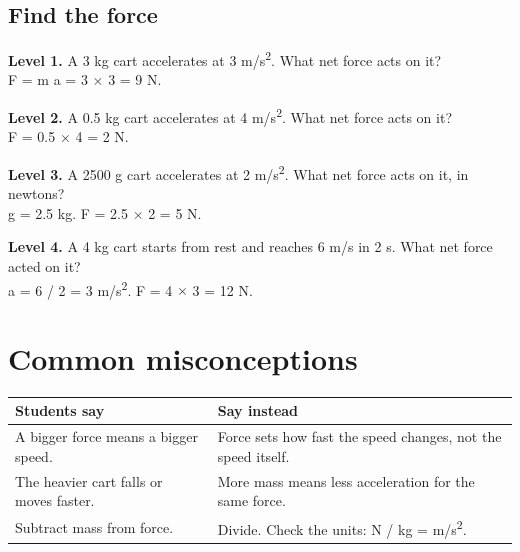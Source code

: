 \documentclass[11pt]{article}
\begin{document}
\subsection*{Find the force}
\noindent\textbf{Level 1.} A 3 kg cart accelerates at 3 m/s\textsuperscript{2}. What net force acts on it?\\  \quad F = m a = 3 $\times$ 3 = 9 N.\par\medskip
\noindent\textbf{Level 2.} A 0.5 kg cart accelerates at 4 m/s\textsuperscript{2}. What net force acts on it?\\  \quad F = 0.5 $\times$ 4 = 2 N.\par\medskip
\noindent\textbf{Level 3.} A 2500 g cart accelerates at 2 m/s\textsuperscript{2}. What net force acts on it, in newtons?\\   g = 2.5 kg. F = 2.5 $\times$ 2 = 5 N.\par\medskip
\noindent\textbf{Level 4.} A 4 kg cart starts from rest and reaches 6 m/s in 2 s. What net force acted on it?\\  \quad a = 6 / 2 = 3 m/s\textsuperscript{2}. F = 4 $\times$ 3 = 12 N.\par\medskip
\section*{Common misconceptions}\begin{tabularx}{\textwidth}{@{}X X@{}}\toprule Students say & Say instead\\\midrule
A bigger force means a bigger speed. & Force sets how fast the speed changes, not the speed itself.\\
The heavier cart falls or moves faster. & More mass means less acceleration for the same force.\\
Subtract mass from force. & Divide. Check the units: N / kg = m/s\textsuperscript{2}.\\
\bottomrule\end{tabularx}
\end{document}
